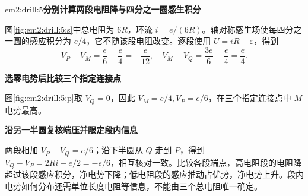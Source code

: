 \begin{drillsolution}{em2:drill:5}\textbf{分别计算两段电阻降与四分之一圈感生积分}\par\nobreak
图\ref{fig:em2:drill:5:s}中总电阻为 $6R$，环流 $i=e/(6R)$。轴对称感生场使每四分之一圆的感应积分为 $e/4$，它不随该段电阻改变。逐段使用 $U=iR-\varepsilon$，得到
\[V_P-V_M=\frac e6-\frac e4=-\frac e{12},\quad V_M-V_Q=\frac{3e}{6}-\frac e4=\frac e4.\]



\par\medskip{}\noindent\textbf{选零电势后比较三个指定连接点}\par\nobreak
图\ref{fig:em2:drill:5:p}取 $V_Q=0$，因此 $V_M=e/4,V_P=e/6$，在三个指定连接点中 $M$ 电势最高。

\par\medskip{}\noindent\textbf{沿另一半圆复核端压并限定段内信息}\par\nobreak
两段相加 $V_P-V_Q=e/6$；沿下半圆从 $Q$ 走到 $P$，得到 $V_Q-V_P=2Ri-e/2=-e/6$，相互核对一致。比较各段端点，高电阻段的电阻降超过该段感应积分，净电势下降；低电阻段的感应推动占优势，净电势上升。段内电势如何分布还需单位长度电阻等信息，不能由三个总电阻唯一确定。\end{drillsolution}
